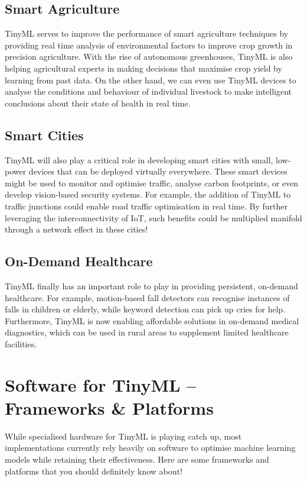 \section{Smart Agriculture}

TinyML serves to improve the performance of smart agriculture techniques by providing real time analysis of environmental factors to improve crop growth in precision agriculture. With the rise of autonomous greenhouses, TinyML is also helping agricultural experts in making decisions that maximise crop yield by learning from past data. On the other hand, we can even use TinyML devices to analyse the conditions and behaviour of individual livestock to make intelligent conclusions about their state of health in real time.

\section{Smart Cities}

TinyML will also play a critical role in developing smart cities with small, low-power devices that can be deployed virtually everywhere. These smart devices might be used to monitor and optimise traffic, analyse carbon footprints, or even develop vision-based security systems. For example, the addition of TinyML to traffic junctions could enable road traffic optimisation in real time. By further leveraging the interconnectivity of IoT, such benefits could be multiplied manifold through a network effect in these cities!

\section{On-Demand Healthcare}

TinyML finally has an important role to play in providing persistent, on-demand healthcare. For example, motion-based fall detectors can recognise instances of falls in children or elderly, while keyword detection can pick up cries for help. Furthermore, TinyML is now enabling affordable solutions in on-demand medical diagnostics, which can be used in rural areas to supplement limited healthcare facilities.

\chapter{Software for TinyML – Frameworks \& Platforms}
While specialised hardware for TinyML is playing catch up, most implementations currently rely heavily on software to optimise machine learning models while retaining their effectiveness. Here are some frameworks and platforms that you should definitely know about!

